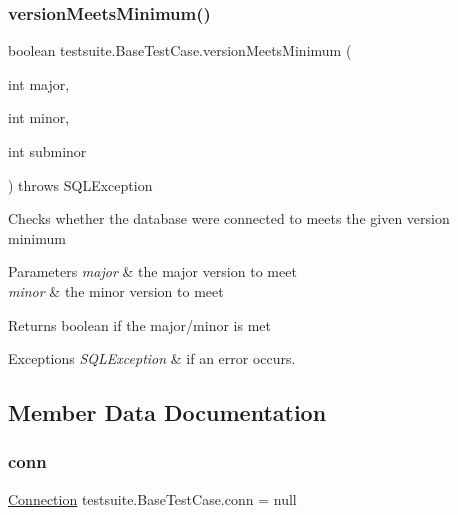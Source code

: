 \subsubsection{\texorpdfstring{version\+Meets\+Minimum()}{versionMeetsMinimum()}\hspace{0.1cm}{\footnotesize\ttfamily [2/2]}}
{\footnotesize\ttfamily boolean testsuite.\+Base\+Test\+Case.\+version\+Meets\+Minimum (\begin{DoxyParamCaption}\item[{int}]{major,  }\item[{int}]{minor,  }\item[{int}]{subminor }\end{DoxyParamCaption}) throws S\+Q\+L\+Exception\hspace{0.3cm}{\ttfamily [protected]}}

Checks whether the database we\textquotesingle{}re connected to meets the given version minimum


\begin{DoxyParams}{Parameters}
{\em major} & the major version to meet \\
\hline
{\em minor} & the minor version to meet\\
\hline
\end{DoxyParams}
\begin{DoxyReturn}{Returns}
boolean if the major/minor is met
\end{DoxyReturn}

\begin{DoxyExceptions}{Exceptions}
{\em S\+Q\+L\+Exception} & if an error occurs. \\
\hline
\end{DoxyExceptions}


\subsection{Member Data Documentation}
\mbox{\label{classtestsuite_1_1_base_test_case_a51c71d14ae22c75fb285989cc78b4730}} 
\subsubsection{\texorpdfstring{conn}{conn}}
{\footnotesize\ttfamily \mbox{\hyperlink{interfacecom_1_1mysql_1_1jdbc_1_1_connection}{Connection}} testsuite.\+Base\+Test\+Case.\+conn = null\hspace{0.3cm}{\ttfamily [protected]}}

